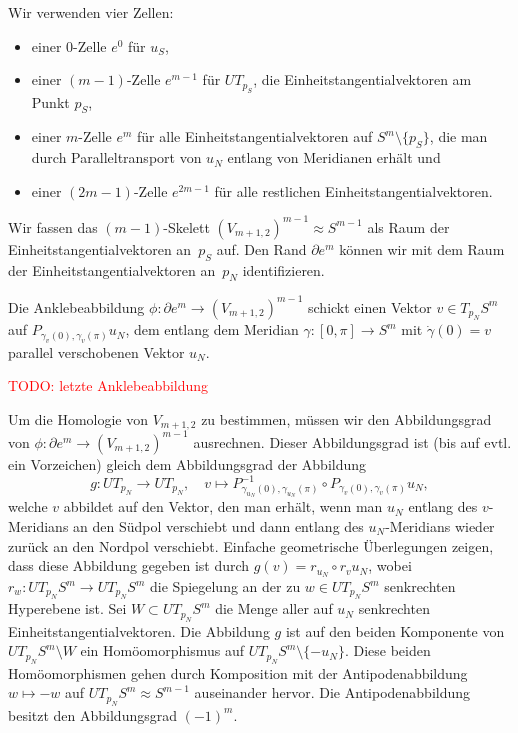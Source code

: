\documentclass[11pt, a4paper, german]{article}
\theoremstyle{definition}
\theoremstyle{remark}
\newcommand{\TODO}[1]{\textcolor{red}{TODO: #1}} %
\newcommand{\R}{\mathbb{R}} %
\newcommand{\V}[2]{V_{{#2},{#1}}} %
\begin{document}
Wir verwenden vier Zellen:

\begin{itemize}
  \item einer $0$-Zelle $e^0$ für $u_S$,
  \item einer $(m-1)$-Zelle $e^{m-1}$ für $UT_{p_S}$, die Einheitstangentialvektoren am Punkt $p_S$,
  \item einer $m$-Zelle $e^m$ für alle Einheitstangentialvektoren auf $S^m \setminus \{ p_S \}$, die man durch Paralleltransport von $u_N$ entlang von Meridianen erhält und
  \item einer $(2m - 1)$-Zelle $e^{2m-1}$ für alle restlichen Einheitstangentialvektoren.
\end{itemize}

Wir fassen das $(m-1)$-Skelett $(\V{2}{m+1})^{m-1} \approx S^{m-1}$ als Raum der Einheitstangentialvektoren an~$p_S$ auf.
Den Rand $\partial e^m$ können wir mit dem Raum der Einheitstangentialvektoren an~$p_N$ identifizieren.

Die Anklebeabbildung $\phi : \partial e^m \to (\V{2}{m+1})^{m-1}$ schickt einen Vektor $v \in T_{p_N} S^m$ auf $P_{\gamma_v(0),\gamma_v(\pi)} u_N$, dem entlang dem Meridian $\gamma : [0, \pi] \to S^m$ mit $\dot{\gamma}(0) = v$ parallel verschobenen Vektor $u_N$.

\TODO{letzte Anklebeabbildung}

Um die Homologie von $\V{2}{m+1}$ zu bestimmen, müssen wir den Abbildungsgrad von $\phi : \partial e^m \to (\V{2}{m+1})^{m-1}$ ausrechnen.
Dieser Abbildungsgrad ist (bis auf evtl. ein Vorzeichen) gleich dem Abbildungsgrad der Abbildung
\[
  g : UT_{p_N} \to UT_{p_N}, \quad
  v \mapsto P_{\gamma_{u_N}(0),\gamma_{u_N}(\pi)}^{-1} \circ P_{\gamma_v(0),\gamma_v(\pi)} u_N,
\]
welche $v$ abbildet auf den Vektor, den man erhält, wenn man $u_N$ entlang des $v$-Meridians an den Südpol verschiebt und dann entlang des $u_N$-Meridians wieder zurück an den Nordpol verschiebt.
Einfache geometrische Überlegungen zeigen, dass diese Abbildung gegeben ist durch $g(v) = r_{u_N} \circ r_{v} u_N$, wobei $r_w : UT_{p_N} S^m \to UT_{p_N} S^m$ die Spiegelung an der zu $w \in UT_{p_N} S^m$ senkrechten Hyperebene ist.
Sei $W \subset UT_{p_N} S^m$ die Menge aller auf $u_N$ senkrechten Einheitstangentialvektoren.
Die Abbildung $g$ ist auf den beiden Komponente von $UT_{p_N} S^m \setminus W$ ein Homöomorphismus auf $UT_{p_N} S^m \setminus \{ -u_N \}$.
Diese beiden Homöomorphismen gehen durch Komposition mit der Antipodenabbildung $w \mapsto -w$ auf $UT_{p_N} S^m \approx S^{m-1}$ auseinander hervor.
Die Antipodenabbildung besitzt den Abbildungsgrad $(-1)^m$.
\end{document}

